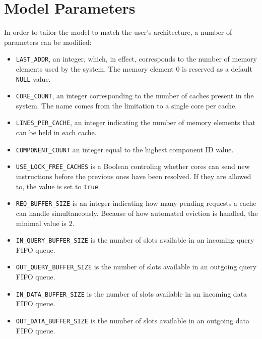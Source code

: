 \chapter{Model Parameters}
\label{app:model_parameters}
In order to tailor the model to match the user's architecture, a number of
parameters can be modified:

\begin{itemize}
\item
   \lstinline!LAST_ADDR!, an integer, which, in effect, corresponds to the
   number of memory elements used by the system. The memory element $0$ is
   reserved as a default \lstinline!NULL! value.
\item
   \lstinline!CORE_COUNT!, an integer corresponding to the number of caches
   present in the system. The name comes from the limitation to a single core
   per cache.
\item
   \lstinline!LINES_PER_CACHE!, an integer indicating the number of memory
   elements that can be held in each cache.
\item
   \lstinline!COMPONENT_COUNT! an integer equal to the highest component ID
   value.
\item
   \lstinline!USE_LOCK_FREE_CACHES! is a Boolean controling whether cores can
   send new instructions before the previous ones have been resolved. If they
   are allowed to, the value is set to \lstinline!true!.
\item
   \lstinline!REQ_BUFFER_SIZE! is an integer indicating how many pending
   requests a cache can handle simultaneously. Because of how automated eviction
   is handled, the minimal value is $2$.
\item
   \lstinline!IN_QUERY_BUFFER_SIZE! is the number of slots available in an
   incoming query FIFO queue.
\item
   \lstinline!OUT_QUERY_BUFFER_SIZE! is the number of slots available in an
   outgoing query FIFO queue.
\item
   \lstinline!IN_DATA_BUFFER_SIZE! is the number of slots available in an
   incoming data FIFO queue.
\item
   \lstinline!OUT_DATA_BUFFER_SIZE! is the number of slots available in an
   outgoing data FIFO queue.
\end{itemize}

